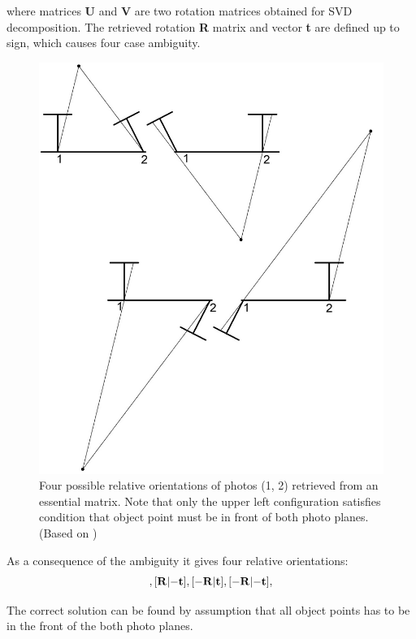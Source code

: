 \documentclass[a4paper,12pt]{article}
\newcommand{\ematr}[1]{%
{\bf #1}%
}
\newcommand{\evect}[1]{%
{\bf #1}%
}
\begin{document}
where matrices \ematr{U} and \ematr{V} are two rotation matrices  obtained for SVD decomposition.
The retrieved rotation \ematr{R} matrix and vector \evect{t} are defined up to sign,
which causes four case ambiguity. 

\begin{figure}[!h]
    \centering
    \includegraphics[scale=0.25]{figures/eo_ambiguity.png}
    \caption{Four possible relative orientations of photos (1, 2) retrieved from an essential matrix.
    Note that only the upper left configuration satisfies condition that object point 
    must be in front of both photo planes. (Based on \cite[p. 19]{pietzsch2001robot})}
    \label{fig:rel_or_amb}
\end{figure}

As a consequence of the  ambiguity it gives four relative orientations: 
\begin{equation}
[\ematr{R}|\evect{t}],
[\ematr{R}|\evect{-t}],
[\ematr{-R}|\evect{t}],
[\ematr{-R}|\evect{-t}],
\end{equation}

The correct solution can be found   by assumption that all object points has to be in the front
of the both photo planes.
\end{document}
